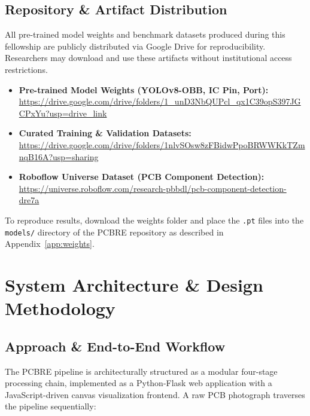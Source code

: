 \documentclass[12pt,a4paper]{report}
\begin{document}
\section{Repository \& Artifact Distribution}
\label{sec:artifact_distribution}

All pre-trained model weights and benchmark datasets produced during this fellowship are publicly distributed via Google Drive for reproducibility. Researchers may download and use these artifacts without institutional access restrictions.

\begin{itemize}
  \item \textbf{Pre-trained Model Weights (YOLOv8-OBB, IC Pin, Port):}\\
    \url{https://drive.google.com/drive/folders/1_unD3NbQUPcl_qx1C39opS397JGCPxYu?usp=drive_link}

  \item \textbf{Curated Training \& Validation Datasets:}\\
    \url{https://drive.google.com/drive/folders/1nlvSOsw8zFBidwPpoBRWWKkTZmnqB16A?usp=sharing}

  \item \textbf{Roboflow Universe Dataset (PCB Component Detection):}\\
    \url{https://universe.roboflow.com/research-pbbdl/pcb-component-detection-dre7a}
\end{itemize}

To reproduce results, download the weights folder and place the \texttt{.pt} files into the \texttt{models/} directory of the PCBRE repository as described in Appendix~\ref{app:weights}.


\chapter{System Architecture \& Design Methodology}
\label{chap:architecture}

\section{Approach \& End-to-End Workflow}
\label{sec:approach}

The PCBRE pipeline is architecturally structured as a modular four-stage processing chain, implemented as a Python-Flask web application with a JavaScript-driven canvas visualization frontend. A raw PCB photograph traverses the pipeline sequentially:
\end{document}
